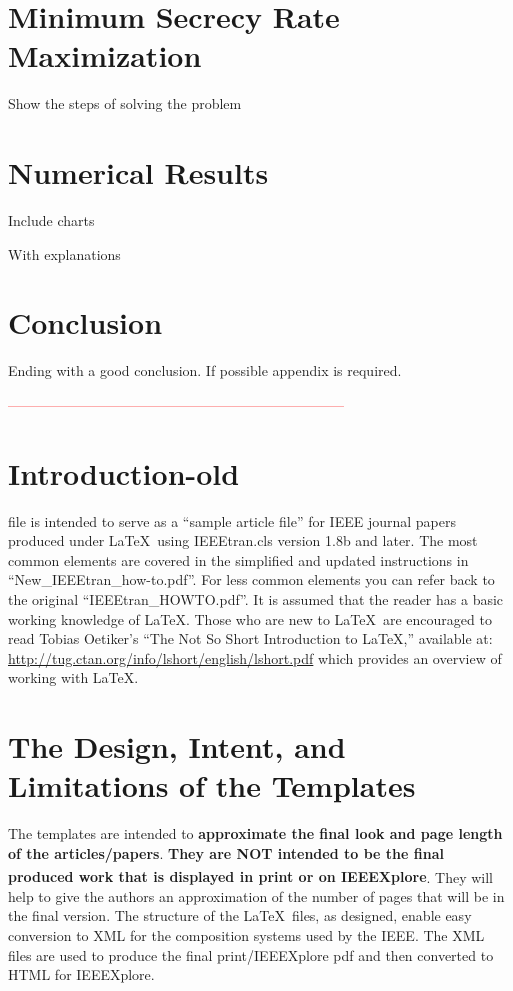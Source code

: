 \documentclass[lettersize,journal]{IEEEtran}
\begin{document}
\section{Minimum Secrecy Rate Maximization}

Show the steps of solving the problem


\section{Numerical Results}

Include charts


With explanations


\section{Conclusion}

Ending with a good conclusion. If possible appendix is required.

\textcolor{red}{------------------------------------------------------------------------}

\section{Introduction-old}


 file is intended to serve as a ``sample article file''
for IEEE journal papers produced under \LaTeX\ using
IEEEtran.cls version 1.8b and later. The most common elements are covered in the simplified and updated instructions in ``New\_IEEEtran\_how-to.pdf''. For less common elements you can refer back to the original ``IEEEtran\_HOWTO.pdf''. It is assumed that the reader has a basic working knowledge of \LaTeX. Those who are new to \LaTeX \ are encouraged to read Tobias Oetiker's ``The Not So Short Introduction to \LaTeX ,'' available at: \url{http://tug.ctan.org/info/lshort/english/lshort.pdf} which provides an overview of working with \LaTeX.

\section{The Design, Intent, and \\ Limitations of the Templates}
The templates are intended to {\bf{approximate the final look and page length of the articles/papers}}. {\bf{They are NOT intended to be the final produced work that is displayed in print or on IEEEXplore\textsuperscript{\textregistered}}}. They will help to give the authors an approximation of the number of pages that will be in the final version. The structure of the \LaTeX\ files, as designed, enable easy conversion to XML for the composition systems used by the IEEE. The XML files are used to produce the final print/IEEEXplore pdf and then converted to HTML for IEEEXplore.
\end{document}
